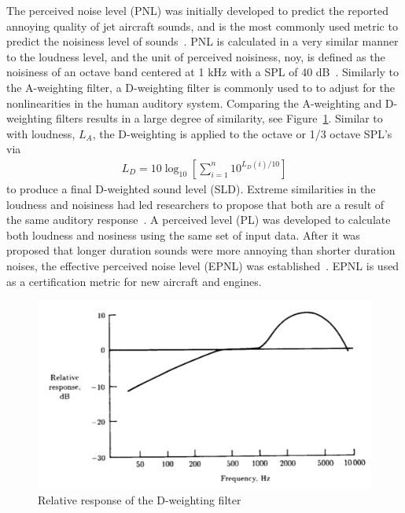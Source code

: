 \documentclass[]{aiaa-tc}%
\begin{document}
The perceived noise level (PNL) was initially developed to predict the reported annoying quality of jet aircraft sounds, and is the most commonly used metric to predict the noisiness level of sounds~\cite{kryter1959scaling}. PNL is calculated in a very similar manner to the loudness level, and the unit of perceived noisiness, noy, is defined as the noisiness of an octave band centered at 1 kHz with a SPL of 40 dB~\cite{powell1991human}. Similarly to the A-weighting filter, a D-weighting filter is commonly used to to adjust for the nonlinearities in the human auditory system. Comparing the A-weighting and D-weighting filters results in a large degree of similarity, see Figure~\ref{fig:d-weighting}. Similar to with loudness, $L_A$, the D-weighting is applied to the octave or 1/3 octave SPL's via
\begin{align}
L_D = 10 \log_{10} \left[ \sum_{i=1}^n 10^{L_D(i)/10} \right]
\end{align}
to produce a final D-weighted sound level (SLD). Extreme similarities in the loudness and noisiness had led researchers to propose that both are a result of the same auditory response~\cite{stevens1972perceived}. A perceived level (PL) was developed to calculate both loudness and nosiness using the same set of input data. After it was proposed that longer duration sounds were more annoying than shorter duration noises, the effective perceived noise level (EPNL) was established~\cite{noisestandards}. EPNL is used as a certification metric for new aircraft and engines.

\begin{figure}[tb!]
  \centering
  \includegraphics[width=\textwidth]{figs/d-weighting.png}
  \caption{Relative response of the D-weighting filter~\cite{powell1991human}}
  \label{fig:d-weighting}
\end{figure}
\end{document}
